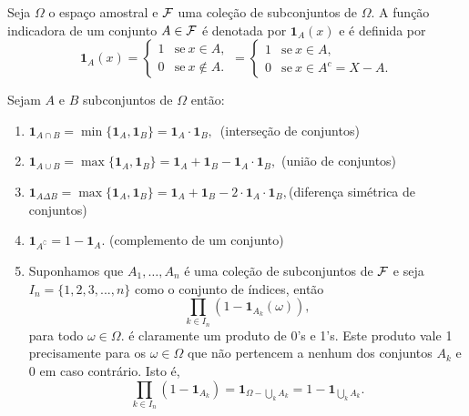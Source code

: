  \begin{frame}
 \begin{defi}
 Seja $\Omega$ o espaço amostral e ${\cal F}$ uma coleção de subconjuntos de $\Omega.$ A função indicadora de um conjunto $A \in {\cal F} $ é denotada por $\mathbf{1}_A(x)$ e é definida por 
 $$
\mathbf{1}_A(x) = 
\begin{cases}
1 &\text{se}\ x \in A, \\
0 &\text{se}\ x \notin A. 
\end{cases} = 
\begin{cases}
1 &\text{se}\ x \in A, \\
0 &\text{se}\ x \in A^c = X - A. 
\end{cases}
 $$
 \end{defi}
 
Sejam $A$ e $B$ subconjuntos de $\Omega$ então:
 \begin{enumerate}
\item $\mathbf{1}_{A\cap B} = \min\{\mathbf{1}_A,\mathbf{1}_B\} = \mathbf{1}_A \cdot\mathbf{1}_B,\,$ (interseção de conjuntos)
\item $\mathbf{1}_{A\cup B} = \max\{{\mathbf{1}_A,\mathbf{1}_B}\} = \mathbf{1}_A + \mathbf{1}_B - \mathbf{1}_A \cdot\mathbf{1}_B,$ (união de conjuntos)
\item $\mathbf{1}_{A\Delta B} = \max\{{\mathbf{1}_A,\mathbf{1}_B}\} = \mathbf{1}_A + \mathbf{1}_B - 2 \cdot \mathbf{1}_A \cdot\mathbf{1}_B, $(diferença simétrica de conjuntos)
\item $\mathbf{1}_{A^\complement} = 1-\mathbf{1}_A.$ (complemento de um conjunto)
 \item Suponhamos que $A_1, \ldots, A_n$ é uma coleção de subconjuntos de $ {\cal F}  $ e seja $I_n = \{1,2,3,...,n\}$ como o conjunto de índices, então
 $$ \prod_{k \in I_n} ( 1 - \mathbf{1}_{A_k}(\omega)),$$  para todo $\omega \in \Omega. $
 é claramente um produto de 0's e 1's. Este produto vale 1 precisamente para os $\omega \in \Omega$ que não pertencem a nenhum dos conjuntos $A_k$ e 0 em caso contrário. Isto é,
  $$\prod_{k \in I_n} ( 1 - \mathbf{1}_{A_k}) = \mathbf{1}_{\Omega - \bigcup_{k} A_k} = 1 - \mathbf{1}_{\bigcup_{k} A_k}.$$
\end{enumerate}
% 
% 
% 
 \end{frame}

